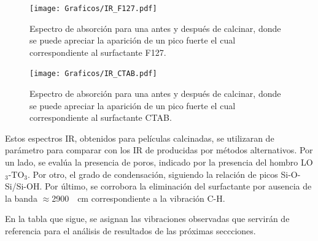 				\begin{figure}[!ht]
						\begin{center}
						\texttt{[image: Graficos/IR\_F127.pdf]}
						\caption[FTIR para una \pdmF.]{Espectro de absorción para una \pdmF\space antes y después de calcinar, donde se puede apreciar la aparición de un pico fuerte el cual correspondiente al surfactante F127.}
						\label{fig:IR_F127_calciando}
						\end{center}
						\end{figure}
				
				\begin{figure}[!ht]
						\begin{center}
						\texttt{[image: Graficos/IR\_CTAB.pdf]}
						\caption[FTIR para una \pdmC.]{Espectro de absorción para una \pdmC\space antes y después de calcinar, donde se puede apreciar la aparición de un pico fuerte el cual correspondiente al surfactante CTAB.}
						\label{fig:IR_CTAB_calcinado}
						\end{center}
						\end{figure}		
		 
		 Estos espectros IR, obtenidos para películas calcinadas, se utilizaran de parámetro para comparar con los IR de \pdm\space producidas por métodos alternativos. Por un lado, se evalúa la presencia de poros, indicado por la presencia del hombro LO$_3$-TO$_3$. Por otro, el grado de condensación, siguiendo la relación de picos Si-O-Si/Si-OH. Por último, se corrobora la eliminación del surfactante por ausencia de la banda $\approx$\SI{2900}{\per\cm} correspondiente a la vibración C-H.

		 En la tabla que sigue, se asignan las vibraciones observadas que servirán de referencia para el análisis de resultados de las próximas seccciones.

